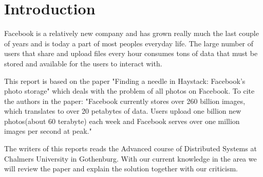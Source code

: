 \section{Introduction}
Facebook is a relatively new company and has grown really much the last couple of years and is today a part of most peoples everyday life. The large number of users that share and upload files every hour consumes tons of data that must be stored and available for the users to interact with. 

This report is based on the paper "Finding a needle in Haystack: Facebook's photo storage" which deals with the problem of all photos on Facebook. To cite the authors in the paper: "Facebook currently stores over 260 billion images, which translates to over 20 petabytes of data. Users upload one billion new photos(about 60 terabyte) each week and Facebook serves over one million images per second at peak." 

The writers of this reports reads the Advanced course of Distributed Systems at Chalmers University in Gothenburg. With our current knowledge in the area we will review the paper and explain the solution together with our criticism.

